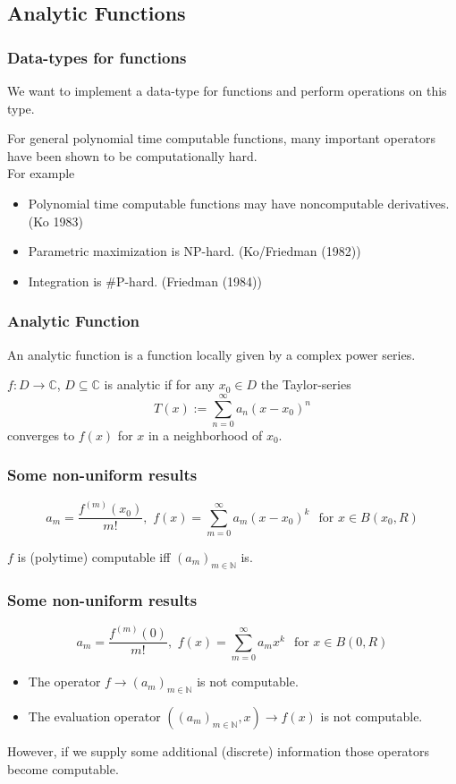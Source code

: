 \documentclass[xcolor=pdftex,dvipsnames,table]{beamer}
\newcommand{\N}{\ensuremath{\mathbb{N}}}
\newcommand{\C}{\ensuremath{\mathbb{C}}}
\begin{document}
\subsection{Analytic Functions}
\begin{frame}
\frametitle{Data-types for functions}
We want to implement a data-type for functions and perform operations on this type.
\pause
\begin{fact}
For general polynomial time computable functions, many important operators have been shown to be computationally hard.\\
For example
\pause
\begin{itemize}[<+->]
\item Polynomial time computable functions may have noncomputable derivatives. (Ko 1983)
\item Parametric maximization is NP-hard. (Ko/Friedman (1982))
\item Integration is \#P-hard. (Friedman (1984))
\end{itemize}
\end{fact}
\end{frame}
\begin{frame}
\frametitle{Analytic Function}
An analytic function is a function locally given by a complex power series.\\
\begin{definition}
$f : D \to \C $, $D \subseteq \C$ is analytic if for any $x_0 \in D$ the Taylor-series
$$ T(x) := \sum^\infty_{n=0} a_n(x-x_0)^n$$
converges to $f(x)$ for $x$ in a neighborhood of $x_0$.  
\end{definition}
\end{frame}
\begin{frame}
\frametitle{Some non-uniform results}

$$a_m =\frac{f^{(m)}(x_0)}{m!} 
, \,\, f(x) = \sum_{m=0}^\infty a_m(x-x_0)^k \,\ \text{ for } x \in B(x_0,R)
$$
\vfill
\begin{theorem}
$f$ is (polytime) computable iff $(a_m)_{m \in \N}$ is.
\end{theorem}
\end{frame}
\begin{frame}
\frametitle{Some non-uniform results}
$$a_m =\frac{f^{(m)}(0)}{m!} 
, \,\, f(x) = \sum_{m=0}^\infty a_mx^k \,\ \text{ for } x \in B(0,R)
$$
\vfill
\begin{theorem}[M\"uller (1995)]
\begin{itemize}
\item The operator $f \to (a_m)_{m \in \N}$ is not computable.
\item The evaluation operator $((a_m)_{m \in \N},x) \to f(x) $ is not computable.
\end{itemize}
\end{theorem}
\pause
However, if we supply some additional (discrete) information those operators become computable.
\end{frame}
\end{document}
